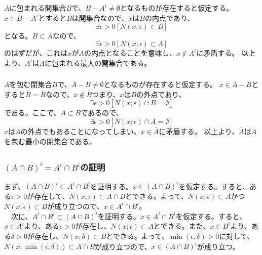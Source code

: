 \documentclass{jsarticle}
\begin{document}
\subsection{}
\subsubsection{}
$A$に包まれる開集合$B$で、$B-A^i\neq \emptyset$となるものが存在すると仮定する。
$x\in B-A^i$とすると$B$は開集合なので、$x$は$B$の内点であり、
\[\exists\epsilon>0[N(x;\epsilon)\subset B]\]
となる。$B\subset A$なので、
\[\exists\epsilon>0[N(x;\epsilon)\subset A]\]
のはずだが、これは$x$が$A$の内点となることを意味し、$x\notin A^i$に矛盾する。
以上より、$A^i$は$A$に包まれる最大の開集合である。


\subsubsection{}
$A$を包む閉集合$B$で、$\bar{A}-B\neq \emptyset$となるものが存在すると仮定する。
$x\in \bar{A}-B$とすると$B=\bar{B}$なので、$x\notin\bar{B}$つまり、$x$は$B$の外点であり、
\[\exists\epsilon>0[N(x;\epsilon)\cap B=\emptyset]\]
である。ここで、$A\subset B$であるので、
\[\exists\epsilon>0[N(x;\epsilon)\cap A=\emptyset]\]
$x$は$A$の外点でもあることになってしまい、$x\in \bar{A}$に矛盾する。
以上より、$\bar{A}$は$A$を包む最小の閉集合である。


\subsection{}
\subsubsection{$(A\cap B)^i=A^i\cap B^i$の証明}
まず、$(A\cap B)^i\subset A^i\cap B^i$を証明する。$x\in (A\cap B)^i$を仮定する。すると、ある$\epsilon>0$が存在して、$N(x;\epsilon)\subset A\cap B$とできる。よって、$N(x;\epsilon)\subset A$かつ$N(x;\epsilon)\subset B$が成り立つので、$x\in A^i\cap B^i$。\\
　次に、$A^i\cap B^i\subset(A\cap B)^i$を証明する。$x\in A^i\cap B^i$を仮定する。すると、$x\in A^i$より、ある$\epsilon>0$が存在し、$N(x;\epsilon)\subset A$とできる。また、$x\in B^i$より、ある$\delta>0$が存在し、$N(x;\delta)\subset B$とできる。よって、$\min(\epsilon,\delta)>0$に対して、$N(x;\min(\epsilon,\delta))\subset A\cap B$が成り立つので、$x\in (A\cap B)^i$が成り立つ。
\end{document}
